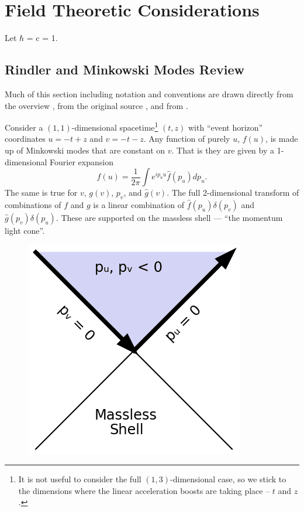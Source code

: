 \documentclass[12pt,a4paper]{article}
\begin{document}
\section{Field Theoretic Considerations}
Let $\hbar$ = c = 1.
\subsection{Rindler and Minkowski Modes Review}
Much of this section including notation and conventions are drawn directly from the overview \cite{Frodden}, from the original source \cite{unruh}, and from \cite{beisert}.

Consider a $(1,1)$-dimensional spacetime\footnote{It is not useful to consider the full $(1,3)$-dimensional case, so we stick to the dimensions where the linear acceleration boosts are taking place -- $t$ and $z$.} $(t,z)$ with ``event horizon'' coordinates $u = -t + z$ and $v = -t - z$.   Any function of purely $u$, $f(u)$, is made up of Minkowski modes that are constant on $v$.  That is they are given by a 1-dimensional Fourier expansion
\[
f(u) = \frac{1}{2\pi} \int{e^{i p_u u} \hat{f}(p_u) dp_u}.
\]
The same is true for $v$, $g(v)$, $p_v$, and $\hat{g}(v)$.  The full 2-dimensional transform of combinations of $f$ and $g$ is a linear combination of $\hat{f}(p_u) \delta(p_v)$ and $\hat{g}(p_v) \delta(p_u)$.  These are supported on the massless shell --- ``the momentum light cone''.

\begin{figure}[h]
\centering
\includegraphics[scale=1.0]{massless_shell.png}
\caption{}
\label{masslessshell}
\end{figure}
\end{document}
